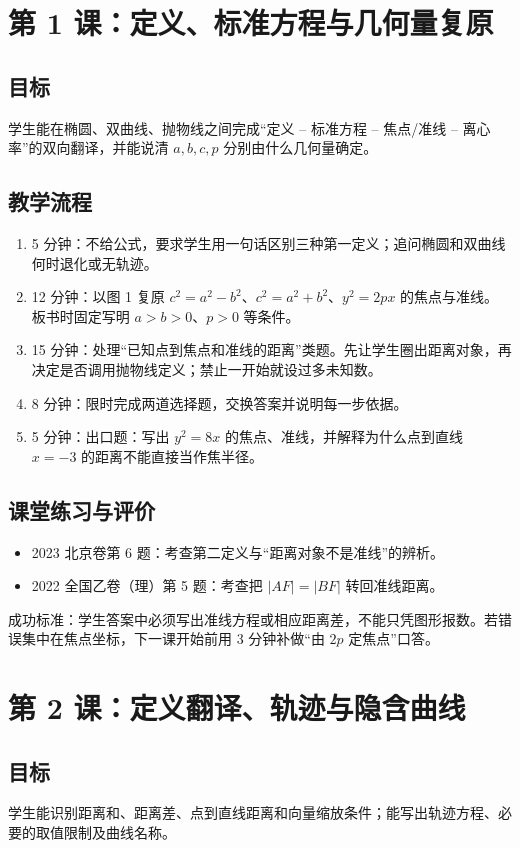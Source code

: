 \documentclass[UTF8,a4paper,11pt]{ctexart}
\newcommand{\lesson}[1]{\section{#1}}
\begin{document}
\lesson{第 1 课：定义、标准方程与几何量复原}
\subsection*{目标}
学生能在椭圆、双曲线、抛物线之间完成“定义 -- 标准方程 -- 焦点/准线 -- 离心率”的双向翻译，并能说清 $a,b,c,p$ 分别由什么几何量确定。

\subsection*{教学流程}
\begin{enumerate}
  \item 5 分钟：不给公式，要求学生用一句话区别三种第一定义；追问椭圆和双曲线何时退化或无轨迹。
  \item 12 分钟：以图 1 复原 $c^2=a^2-b^2$、$c^2=a^2+b^2$、$y^2=2px$ 的焦点与准线。板书时固定写明 $a>b>0$、$p>0$ 等条件。
  \item 15 分钟：处理“已知点到焦点和准线的距离”类题。先让学生圈出距离对象，再决定是否调用抛物线定义；禁止一开始就设过多未知数。
  \item 8 分钟：限时完成两道选择题，交换答案并说明每一步依据。
  \item 5 分钟：出口题：写出 $y^2=8x$ 的焦点、准线，并解释为什么点到直线 $x=-3$ 的距离不能直接当作焦半径。
\end{enumerate}

\subsection*{课堂练习与评价}
\begin{itemize}
  \item 2023 北京卷第 6 题：考查第二定义与“距离对象不是准线”的辨析。
  \item 2022 全国乙卷（理）第 5 题：考查把 $|AF|=|BF|$ 转回准线距离。
\end{itemize}
成功标准：学生答案中必须写出准线方程或相应距离差，不能只凭图形报数。若错误集中在焦点坐标，下一课开始前用 3 分钟补做“由 $2p$ 定焦点”口答。

\lesson{第 2 课：定义翻译、轨迹与隐含曲线}
\subsection*{目标}
学生能识别距离和、距离差、点到直线距离和向量缩放条件；能写出轨迹方程、必要的取值限制及曲线名称。
\end{document}
